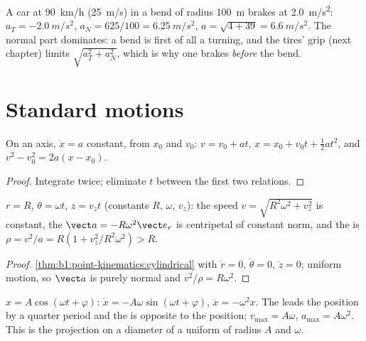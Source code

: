 \begin{example}\label{ex:b1:point-kinematics:bend}
A car at \qty{90}{km/h} (\qty{25}{m/s}) in a bend of radius \qty{100}{m}
brakes at \qty{2.0}{m/s^2}: $a_T = \qty{-2.0}{m/s^2}$, $a_N = 625/100 =
\qty{6.25}{m/s^2}$, $a = \sqrt{4 + 39} = \qty{6.6}{m/s^2}$. The normal
part dominates: a bend is first of all a turning, and the tires' grip
(next chapter) limits $\sqrt{a_T^2 + a_N^2}$, which is why one brakes
\emph{before} the bend.
\end{example}

\section{Standard motions}

\begin{proposition}\label{prop:b1:point-kinematics:uarm}
On an axis, $\ddot x = a$ constant, from $x_0$ and $v_0$:
$v = v_0 + at$, $x = x_0 + v_0t + \tfrac12 at^2$, and
$v^2 - v_0^2 = 2a(x - x_0)$.
\end{proposition}

\begin{proof}
Integrate twice; eliminate $t$ between the first two relations.
\end{proof}

\begin{proposition}\label{prop:b1:point-kinematics:helix}
$r = R$, $\theta = \omega t$, $z = v_zt$ (constants $R$, $\omega$, $v_z$):
the speed $v = \sqrt{R^2\omega^2 + v_z^2}$ is constant, the 
$\vect a = -R\omega^2\vect e_r$ is centripetal of constant norm, and the
 is $\rho = v^2/a = R(1 + v_z^2/R^2\omega^2) > R$.
\end{proposition}

\begin{proof}
\cref{thm:b1:point-kinematics:cylindrical} with $\dot r = 0$,
$\ddot\theta = 0$, $\ddot z = 0$; uniform motion, so $\vect a$ is purely
normal and $v^2/\rho = R\omega^2$.
\end{proof}

\begin{proposition}\label{prop:b1:point-kinematics:harmonic}
$x = A\cos(\omega t + \varphi)$: $\dot x = -A\omega\sin(\omega t + \varphi)$,
$\ddot x = -\omega^2 x$. The  leads the position by a quarter
period and the  is opposite to the position; $v_{\max} =
A\omega$, $a_{\max} = A\omega^2$. This is the projection on a diameter of
a uniform  of radius $A$ and  $\omega$.
\end{proposition}

